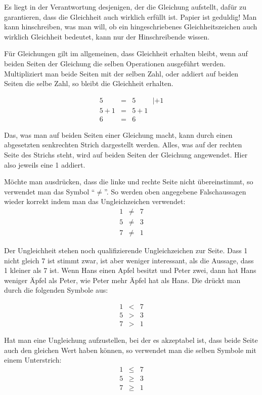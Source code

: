 Es liegt in der Verantwortung desjenigen, der die Gleichung aufstellt, dafür zu garantieren, dass die Gleichheit auch wirklich erfüllt ist. Papier ist geduldig! Man kann hinschreiben, was man will, ob ein hingeschriebenes Gleichheitszeichen auch wirklich Gleichheit bedeutet, kann nur der Hinschreibende wissen.

Für Gleichungen gilt im allgemeinen, dass Gleichheit erhalten bleibt, wenn auf beiden Seiten der Gleichung die selben Operationen ausgeführt werden. Multipliziert man beide Seiten mit der selben Zahl, oder addiert auf beiden Seiten die selbe Zahl, so bleibt die Gleichheit erhalten.

\begin{eqnarray*}
5 &=& 5  \hspace{1cm}| +1\\
5+1 &=& 5+1 \\
6 &=& 6
\end{eqnarray*}

Das, was man auf beiden Seiten einer Gleichung macht, kann durch einen abgesetzten senkrechten Strich dargestellt werden. Alles, was auf der rechten Seite des Strichs steht, wird auf beiden Seiten der Gleichung angewendet. Hier also jeweils eine 1 addiert.

Möchte man ausdrücken, dass die linke und rechte Seite nicht übereinstimmt, so verwendet man das Symbol "`$\neq $"'. So werden oben angegebene Falschaussagen wieder korrekt indem man das Ungleichzeichen verwendet:
\begin{eqnarray*}
1 &\neq & 7 \\
5 &\neq & 3 \\
7 &\neq & 1
\end{eqnarray*}

Der Ungleichheit stehen noch qualifizierende Ungleichzeichen zur Seite. Dass 1 nicht gleich 7 ist stimmt zwar, ist aber weniger interessant, als die Aussage, dass 1 kleiner als 7 ist. Wenn Hans einen Apfel besitzt und Peter zwei, dann hat Hans weniger Äpfel als Peter, wie Peter mehr Äpfel hat als Hans. Die drückt man durch die folgenden Symbole aus:

\begin{eqnarray*}
1 & < & 7 \\
5 & > & 3 \\
7 & > & 1
\end{eqnarray*}

Hat man eine Ungleichung aufzustellen, bei der es akzeptabel ist, dass beide Seite auch den gleichen Wert haben können, so verwendet man die selben Symbole mit einem Unterstrich:
\begin{eqnarray*}
1 & \le & 7 \\
5 & \ge & 3 \\
7 & \ge & 1
\end{eqnarray*}

